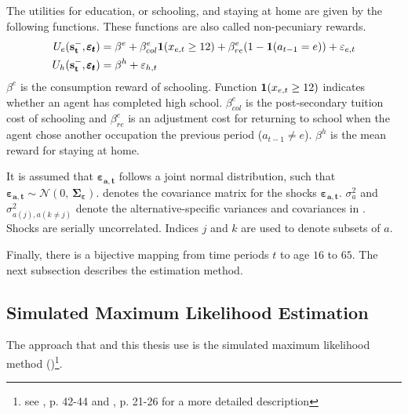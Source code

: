 The utilities for education, or schooling, and staying at home are given by the following functions. These functions are also called non-pecuniary rewards.
\begin{equation} \label{eq:returns_e_h}
\begin{aligned}
U_e(\bold{s_t^-}, \pmb{\varepsilon_t}) &= \beta^e + \beta_{col}^e \bold 1(x_{e,t} \geq 12) + \beta_{re}^e(1-\bold1(a_{t-1}=e)) + \varepsilon_{e,t} \\
U_h(\bold{s_t^-},\pmb{\varepsilon_t}) &= \beta^h + \varepsilon_{h,t} \\
\end{aligned}
\end{equation}
\noindent
$\beta^e$ is the consumption reward of schooling. Function $\bold 1(x_{e,t} \geq 12)$ indicates whether an agent has completed high school. $\beta_{col}^e$ is the post-secondary tuition cost of schooling and $\beta_{re}^e$ is an adjustment cost for returning to school when the agent chose another occupation the previous period ($a_{t-1}\neq e$). $\beta^h$ is the mean reward for staying at home.

It is assumed that $\pmb{\varepsilon_{a,t}}$ follows a joint normal distribution, such that $\pmb{\varepsilon_{a,t}} \sim \mathcal{N}(0,\,\pmb{\Sigma_\varepsilon})$. \pmb{$\Sigma_\varepsilon$} denotes the covariance matrix for the shocks $\pmb{\varepsilon_{a,t}}$. $\sigma_a^{2}$ and $\sigma^{2}_{a(j),a(k\neq j)}$ denote the alternative-specific variances and covariances in \pmb{$\Sigma_\varepsilon$}. Shocks are serially uncorrelated. Indices $j$ and $k$ are used to denote subsets of $a$.

Finally, there is a bijective mapping from time periods $t$ to age $16$ to $65$. The next subsection describes the estimation method.

\subsection{Simulated Maximum Likelihood Estimation}

The approach that \cite{Keane.1994} and this thesis use is the simulated maximum likelihood method (\cite{Albright.1977})\footnote{see \cite{Aguirregabiria.2010}, p. 42-44 and \cite{Raabe.2019}, p. 21-26 for a more detailed description}.

